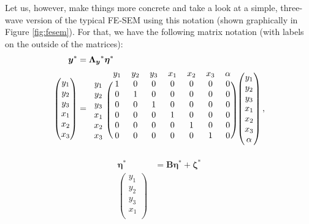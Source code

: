 \documentclass[]{interact}
\theoremstyle{plain}%
\theoremstyle{definition}
\theoremstyle{remark}
\begin{document}
Let us, however, make things more concrete and take a look at a simple,
three-wave version of the typical FE-SEM using this notation (shown
graphically in Figure \ref{fig:fesem}). For that, we have the following
matrix notation (with labels on the outside of the matrices):
\begin{align}
\begin{split}
\bm{y}^{*} & = \bm{\Lambda_{y}}^{*}\bm{\eta}^{*} \\
\begin{pmatrix}
y_{1} \\
y_{2} \\
y_{3} \\
x_{1} \\
x_{2} \\
x_{3}
\end{pmatrix} & = 
\begin{blockarray}{cccccccc}
 & y_{1} & y_{2} & y_{3} & x_{1} & x_{2} & x_{3} & \alpha \\
 \begin{block}{c(ccccccc)}
 y_{1} & 1 & 0 & 0 & 0 & 0 & 0 & 0 \\
 y_{2} & 0 & 1 & 0 & 0 & 0 & 0 & 0 \\
 y_{3} & 0 & 0 & 1 & 0 & 0 & 0 & 0 \\ 
 x_{1} & 0 & 0 & 0 & 1 & 0 & 0 & 0 \\
 x_{2} & 0 & 0 & 0 & 0 & 1 & 0 & 0 \\
 x_{3} & 0 & 0 & 0 & 0 & 0 & 1 & 0 \\
 \end{block}
\end{blockarray}
\begin{pmatrix}
y_{1} \\
y_{2} \\
y_{3} \\
x_{1} \\
x_{2} \\
x_{3} \\
\alpha
\end{pmatrix},
\end{split} \label{eq:y}
\end{align} \begin{align}
\begin{split}
\bm{\eta}^{*} & = \bm{B}\bm{\eta}^{*} + \bm{\zeta}^{*} \\
\begin{pmatrix}
y_{1} \\
y_{2} \\
y_{3} \\
x_{1} \\

\end{pmatrix}
\end{split}
\end{align}
\end{document}
